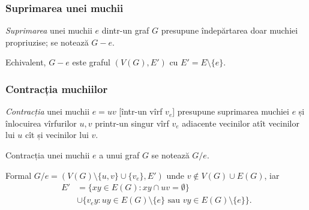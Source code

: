 \begin{frame}
  \frametitle{Suprimarea unei muchii}

\emph{Suprimarea} unei muchii $e$ dintr-un graf $G$ presupune îndepărtarea doar muchiei propriuzise; se notează $G-e$.\pause

Echivalent, $G-e$ este graful $(V(G), E')$ cu $E'=E\setminus\{e\}$.\pause

\begin{figure}
\centering%
\end{figure}

\end{frame}

\begin{frame}
  \frametitle{Contracția muchiilor}

\emph{Contracția} unei muchii $e=uv$ [într-un vîrf $v_e$] presupune suprimarea muchiei $e$ și înlocuirea vîrfurilor $u,v$ printr-un singur vîrf $v_e$ adiacente vecinilor atît vecinilor lui $u$ cît și vecinilor lui $v$.\pause

Contracția unei muchii $e$ a unui graf $G$ se notează $G/e$.\pause

Formal $G/e=(V(G)\setminus\{u,v\}\cup \{v_e\},E')$ unde $v\notin V(G)\cup E(G)$, iar 
\[
  \begin{array}{ll}
    E'&=\{xy\in E(G):xy\cap uv=\emptyset\}\\
      &\cup \{v_ey:uy\in E(G)\setminus\{e\} \text{ sau } vy\in E(G)\setminus\{e\}\}.
  \end{array}
\]


 
\end{frame}

